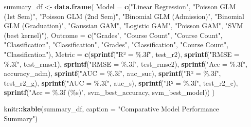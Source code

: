 \documentclass[
]{article}
\newenvironment{Shaded}{\begin{snugshade}}{\end{snugshade}}
\newcommand{\AttributeTok}[1]{\textcolor[rgb]{0.13,0.29,0.53}{#1}}
\newcommand{\FunctionTok}[1]{\textcolor[rgb]{0.13,0.29,0.53}{\textbf{#1}}}
\newcommand{\NormalTok}[1]{#1}
\newcommand{\OtherTok}[1]{\textcolor[rgb]{0.56,0.35,0.01}{#1}}
\newcommand{\SpecialCharTok}[1]{\textcolor[rgb]{0.81,0.36,0.00}{\textbf{#1}}}
\newcommand{\StringTok}[1]{\textcolor[rgb]{0.31,0.60,0.02}{#1}}
\begin{document}
\begin{Shaded}
\begin{Highlighting}[]
\NormalTok{summary\_df }\OtherTok{\textless{}{-}} \FunctionTok{data.frame}\NormalTok{(}
  \AttributeTok{Model =} \FunctionTok{c}\NormalTok{(}\StringTok{"Linear Regression"}\NormalTok{, }\StringTok{"Poisson GLM (1st Sem)"}\NormalTok{, }\StringTok{"Poisson GLM (2nd Sem)"}\NormalTok{,}
            \StringTok{"Binomial GLM (Admission)"}\NormalTok{, }\StringTok{"Binomial GLM (Graduation)"}\NormalTok{,}
            \StringTok{"Gaussian GAM"}\NormalTok{, }\StringTok{"Logistic GAM"}\NormalTok{, }\StringTok{"Poisson GAM"}\NormalTok{, }\StringTok{"SVM (best kernel)"}\NormalTok{),}
  \AttributeTok{Outcome =} \FunctionTok{c}\NormalTok{(}\StringTok{"Grades"}\NormalTok{, }\StringTok{"Course Count"}\NormalTok{, }\StringTok{"Course Count"}\NormalTok{, }\StringTok{"Classification"}\NormalTok{,}
              \StringTok{"Classification"}\NormalTok{, }\StringTok{"Grades"}\NormalTok{, }\StringTok{"Classification"}\NormalTok{, }\StringTok{"Course Count"}\NormalTok{, }\StringTok{"Classification"}\NormalTok{),}
  \AttributeTok{Metric =} \FunctionTok{c}\NormalTok{(}\FunctionTok{sprintf}\NormalTok{(}\StringTok{"R² = \%.3f"}\NormalTok{, test\_r2),}
             \FunctionTok{sprintf}\NormalTok{(}\StringTok{"RMSE = \%.3f"}\NormalTok{, test\_rmse1),}
             \FunctionTok{sprintf}\NormalTok{(}\StringTok{"RMSE = \%.3f"}\NormalTok{, test\_rmse2),}
             \FunctionTok{sprintf}\NormalTok{(}\StringTok{"Acc = \%.3f"}\NormalTok{, accuracy\_adm),}
             \FunctionTok{sprintf}\NormalTok{(}\StringTok{"AUC = \%.3f"}\NormalTok{, auc\_suc),}
             \FunctionTok{sprintf}\NormalTok{(}\StringTok{"R² = \%.3f"}\NormalTok{, test\_r2\_g),}
             \FunctionTok{sprintf}\NormalTok{(}\StringTok{"AUC = \%.3f"}\NormalTok{, auc\_s),}
             \FunctionTok{sprintf}\NormalTok{(}\StringTok{"R² = \%.3f"}\NormalTok{, test\_r2\_c),}
             \FunctionTok{sprintf}\NormalTok{(}\StringTok{"Acc = \%.3f (\%s)"}\NormalTok{, svm\_best\_accuracy, svm\_best\_model))}
\NormalTok{)}

\NormalTok{knitr}\SpecialCharTok{::}\FunctionTok{kable}\NormalTok{(summary\_df, }\AttributeTok{caption =} \StringTok{"Comparative Model Performance Summary"}\NormalTok{)}
\end{Highlighting}
\end{Shaded}
\end{document}
